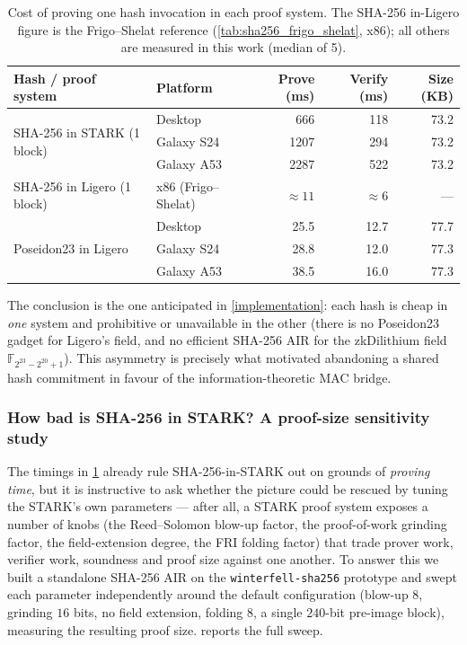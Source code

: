 \documentclass{article}
\begin{document}
\begin{table}[ht]
  \centering
  \caption{Cost of proving one hash invocation in each proof system. The SHA-256
  in-Ligero figure is the Frigo--Shelat reference (\cref{tab:sha256_frigo_shelat},
  x86); all others are measured in this work (median of 5).}
  \label{tab:res-hash}
  \small
  \begin{tabular}{@{}llrrr@{}}
    \toprule
    \textbf{Hash / proof system} & \textbf{Platform} & \textbf{Prove (ms)} & \textbf{Verify (ms)} & \textbf{Size (KB)} \\
    \midrule
    \multirow{3}{*}{SHA-256 in STARK (1 block)}
        & Desktop    & 666  & 118 & 73.2 \\
        & Galaxy S24 & 1207 & 294 & 73.2 \\
        & Galaxy A53 & 2287 & 522 & 73.2 \\
    \midrule
    SHA-256 in Ligero (1 block) & x86 (Frigo--Shelat) & \multicolumn{1}{r}{$\approx 11$} & \multicolumn{1}{r}{$\approx 6$} & --- \\
    \midrule
    \multirow{3}{*}{Poseidon23 in Ligero}
        & Desktop    & 25.5 & 12.7 & 77.7 \\
        & Galaxy S24 & 28.8 & 12.0 & 77.3 \\
        & Galaxy A53 & 38.5 & 16.0 & 77.3 \\
    \bottomrule
  \end{tabular}
\end{table}

The conclusion is the one anticipated in \cref{implementation}: each hash is
cheap in \emph{one} system and prohibitive or unavailable in the other (there is
no Poseidon23 gadget for Ligero's field, and no efficient SHA-256 AIR for the
zkDilithium field $\mathbb{F}_{2^{23}-2^{20}+1}$). This asymmetry is precisely
what motivated abandoning a shared hash commitment in favour of the
information-theoretic MAC bridge.

\subsubsection{How bad is SHA-256 in STARK? A proof-size sensitivity study}
\label{results:hash-sweep}
The timings in \cref{tab:res-hash} already rule SHA-256-in-STARK out on grounds of
\emph{proving time}, but it is instructive to ask whether the picture could be
rescued by tuning the STARK's own parameters --- after all, a STARK proof system
exposes a number of knobs (the Reed--Solomon blow-up factor, the proof-of-work
grinding factor, the field-extension degree, the FRI folding factor) that trade
prover work, verifier work, soundness and proof size against one another. To
answer this we built a standalone SHA-256 AIR on the
\texttt{winterfell-sha256} prototype and swept each parameter independently
around the default configuration (blow-up $8$, grinding $16$ bits, no field
extension, folding $8$, a single $240$-bit pre-image block), measuring the
resulting proof size.  reports the full sweep.
\end{document}
